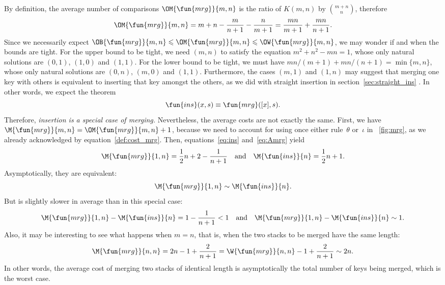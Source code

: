 By definition, the average number of comparisons
\(\OM{\fun{mrg}}{m,n}\) is the ratio
of \(K(m,n)\) by \(\binom{m+n}{n}\), therefore
\begin{equation}
\OM{\fun{mrg}}{m,n} = m + n - \frac{m}{n+1} - \frac{n}{m+1}
  = \frac{mn}{m+1} + \frac{mn}{n+1}.
\label{eq:Amrg}
\end{equation}
Since we necessarily expect \(\OB{\fun{mrg}}{m,n} \leqslant
\OM{\fun{mrg}}{m,n} \leqslant \OW{\fun{mrg}}{m,n}\), we may wonder if
and when the bounds are tight. For the upper bound to be tight, we
need \((m,n)\) to satisfy the equation \(m^2 + n^2 - mn = 1\), whose
only natural solutions are \((0,1)\), \((1,0)\) and \((1,1)\). For the
lower bound to be tight, we must have \(mn/(m+1) + mn/(n+1) =
\min\{m,n\}\), whose only natural solutions are \((0,n)\), \((m,0)\)
and \((1,1)\). Furthermore, the cases \((m,1)\) and \((1,n)\) may
suggest that merging one key with others is equivalent to inserting
that key amongst the others, as we did with straight insertion in
section~\ref{sec:straight_ins} . In other
words, we expect the theorem
\begin{equation}
\fun{ins}(x,s) \equiv \fun{mrg}([x],s).
\label{eq:ins_mrg}
\index{ins@\fun{ins/2}}\index{mrg@\fun{mrg/2}}
\end{equation}
Therefore, \emph{insertion is a special case of merging.}
Nevertheless, the average costs are not exactly the same. First, we
have \(\M{\fun{mrg}}{m,n} = \OM{\fun{mrg}}{m,n} + 1\), because we need
to account for using once either rule~\(\theta\) or~\(\iota\) in
\fig~\ref{fig:mrg}, as we already acknowledged by
equation~\eqref{def:cost_mrg}. Then, equations~\eqref{eq:ins}
 and~\eqref{eq:Amrg} yield
\begin{equation*}
\M{\fun{mrg}}{1,n} = \frac{1}{2}{n} + 2 - \frac{1}{n+1}
\quad\text{and}\quad
\M{\fun{ins}}{n} = \frac{1}{2}{n} + 1.
\index{ins@$\M{\fun{ins}}{n}$}\index{mrg@$\M{\fun{mrg}}{1,n}$}
\end{equation*}
Asymptotically, they are equivalent:
\begin{equation*}
\M{\fun{mrg}}{1,n} \sim \M{\fun{ins}}{n}.
\end{equation*}
But  is slightly slower in average
than  in this special case:
\begin{equation*}
\M{\fun{mrg}}{1,n} - \M{\fun{ins}}{n} = 1 - \frac{1}{n+1} < 1
\quad\text{and}\quad
\M{\fun{mrg}}{1,n} - \M{\fun{ins}}{n} \sim 1.
\end{equation*}
Also, it may be interesting to see what happens when \(m=n\), that is,
when the two stacks to be merged have the same length:
\begin{equation}
\M{\fun{mrg}}{n,n} = 2n - 1 + \frac{2}{n+1} = \W{\fun{mrg}}{n,n} - 1 +
\frac{2}{n+1} \sim 2n.\index{mrg@$\M{\fun{mrg}}{n,n}$}
\label{eq:Amrg_n_n}
\end{equation}
In other words, the average cost of merging two stacks of identical
length is asymptotically the total number of keys being merged, which
is the worst case.

